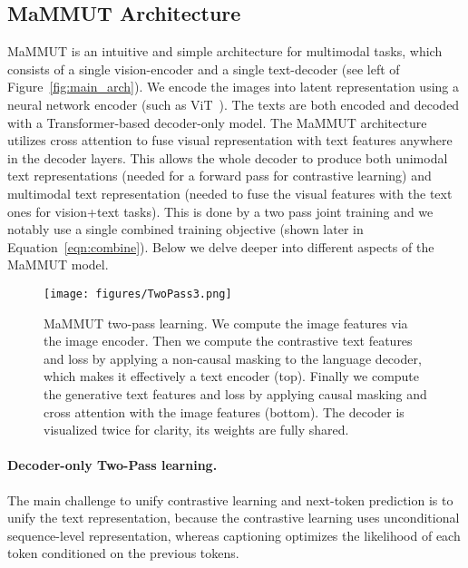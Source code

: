 \documentclass[10pt]{article} \usepackage[accepted]{tmlr}
\newcommand{\ours}{MaMMUT\xspace}
\begin{document}
\vspace{-0.2cm}
\subsection{\ours Architecture}
\vspace{-0.1cm}
\ours is an intuitive and simple architecture for multimodal tasks, which consists of a single vision-encoder and a single text-decoder (see left of Figure~\ref{fig:main_arch}). We encode the images into latent representation using a neural network encoder (such as ViT~\citep{dosovitskiy2020image}). The texts are both encoded and decoded with a Transformer-based decoder-only model.
The \ours architecture utilizes cross attention to fuse visual representation with text features anywhere in the decoder layers.  
 This allows the whole decoder to produce both unimodal text representations (needed for a forward pass for contrastive learning) and multimodal text representation (needed to fuse the visual features with the text ones for vision+text tasks). This is done by a two pass joint training and we notably use a single combined training objective (shown later in Equation~\ref{eqn:combine}). Below we delve deeper into different aspects of the \ours model.



\begin{figure}
    \centering
     \vspace{-0.7cm}
    \texttt{[image: figures/TwoPass3.png]}
     \vspace{-0.2cm}
    \caption{\ours two-pass learning. We compute the image features via the image encoder. Then we compute the contrastive text features and loss by applying a non-causal masking to the language decoder, which makes it effectively a text encoder (top). Finally we compute the generative text features and loss by applying causal masking and cross attention with the image features (bottom). The decoder is visualized twice for clarity, its weights are fully shared.}
    \vspace{-0.4cm}
    \label{fig:two-pass}
\end{figure}

\vspace{-0.1cm}
\paragraph{Decoder-only Two-Pass learning.}\quad 
The main challenge to unify contrastive learning and next-token prediction is to unify the text representation, because the contrastive learning uses unconditional sequence-level representation, whereas captioning optimizes the likelihood of each token conditioned on the previous tokens. 
\end{document}
